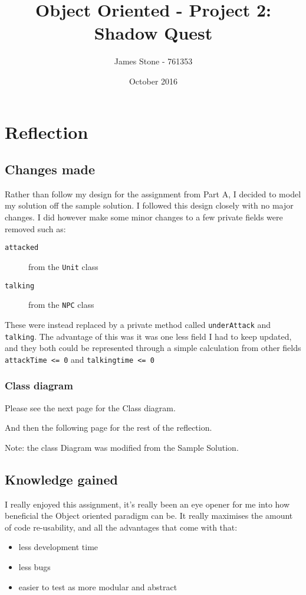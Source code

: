 \documentclass[a4paper]{article}
\title{Object Oriented - Project 2: Shadow Quest}
\author{James Stone - 761353}
\date{October 2016}
\begin{document}
\maketitle

\section{Reflection}

\subsection{Changes made}

Rather than follow my design for the assignment from Part A, I decided to model my solution off the sample solution.
I followed this design closely with no major changes. I did however make some minor changes to a few private fields were removed such as:
\begin{description}
\item[\texttt{attacked}]from the \texttt{Unit} class
\item[\texttt{talking}]from the \texttt{NPC} class
\end{description}
These were instead replaced by a private method called \texttt{underAttack} and \texttt{talking}. The advantage of this was it was one less field I had to keep updated, and they both could be represented through a simple calculation from other fields \texttt{attackTime <= 0} and \texttt{talkingtime <= 0}
\subsubsection{Class diagram}

Please see the next page for the Class diagram.

And then the following page for the rest of the reflection.

Note: the class Diagram was modified from the Sample Solution.



\subsection{Knowledge gained}
I really enjoyed this assignment, it's really been an eye opener for me into how beneficial the Object oriented paradigm can be.
It really maximises the amount of code re-usability, and all the advantages that come with that:
\begin{itemize}
\item less development time
\item less bugs
\item easier to test as more modular and abstract
\end{itemize}
\end{document}
